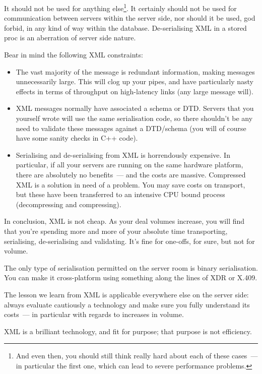 \documentclass{book}
\begin{document}
It should not be used for anything else\footnote{And even then, you
  should still think really hard about each of these cases~--- in
  particular the first one, which can lead to severe performance
  problems.}. It certainly should not be used for communication
between servers within the server side, nor should it be used, god
forbid, in any kind of way within the database. De-serialising XML in
a stored proc is an aberration of server side nature.

Bear in mind the following XML constraints:

\begin{itemize}
\item The vast majority of the message is redundant information,
  making messages unnecessarily large. This will clog up your pipes,
  and have particularly nasty effects in terms of throughput on
  high-latency links (any large message will).
\item XML messages normally have associated a schema or DTD. Servers
  that you yourself wrote will use the same serialisation code, so
  there shouldn't be any need to validate these messages against a
  DTD/schema (you will of course have some sanity checks in C++ code).
\item Serialising and de-serialising from XML is horrendously
  expensive. In particular, if all your servers are running on the
  same hardware platform, there are absolutely no benefits~--- and the
  costs are massive.  Compressed XML is a solution in need of a
  problem. You may save costs on transport, but these have been
  transferred to an intensive CPU bound process (decompressing and
  compressing).
\end{itemize}

In conclusion, XML is not cheap. As your deal volumes increase, you
will find that you're spending more and more of your absolute time
transporting, serialising, de-serialising and validating. It's fine
for one-offs, for sure, but not for volume.

The only type of serialisation permitted on the server room is binary
serialisation. You can make it cross-platform using something along
the lines of XDR or X.409.

The lesson we learn from XML is applicable everywhere else on the
server side: always evaluate cautiously a technology and make sure you
fully understand its costs~--- in particular with regards to increases
in volume.

XML is a brilliant technology, and fit for purpose; that purpose is
not efficiency.
\end{document}
